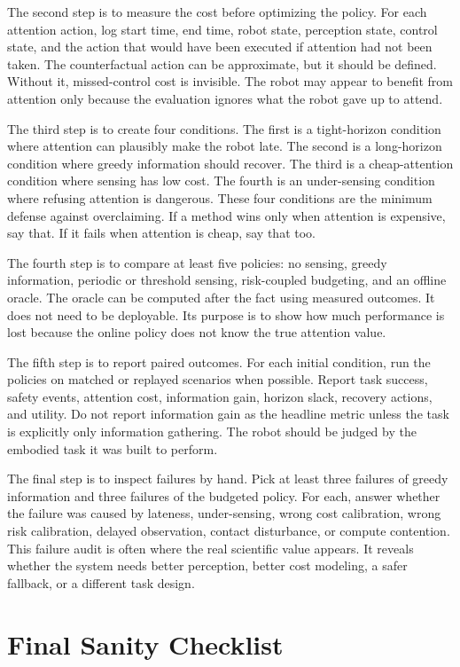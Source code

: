 \documentclass{article}
\begin{document}
The second step is to measure the cost before optimizing the policy. For each
attention action, log start time, end time, robot state, perception state,
control state, and the action that would have been executed if attention had
not been taken. The counterfactual action can be approximate, but it should be
defined. Without it, missed-control cost is invisible. The robot may appear to
benefit from attention only because the evaluation ignores what the robot gave
up to attend.

The third step is to create four conditions. The first is a tight-horizon
condition where attention can plausibly make the robot late. The second is a
long-horizon condition where greedy information should recover. The third is a
cheap-attention condition where sensing has low cost. The fourth is an
under-sensing condition where refusing attention is dangerous. These four
conditions are the minimum defense against overclaiming. If a method wins only
when attention is expensive, say that. If it fails when attention is cheap, say
that too.

The fourth step is to compare at least five policies: no sensing, greedy
information, periodic or threshold sensing, risk-coupled budgeting, and an
offline oracle. The oracle can be computed after the fact using measured
outcomes. It does not need to be deployable. Its purpose is to show how much
performance is lost because the online policy does not know the true attention
value.

The fifth step is to report paired outcomes. For each initial condition, run
the policies on matched or replayed scenarios when possible. Report task
success, safety events, attention cost, information gain, horizon slack,
recovery actions, and utility. Do not report information gain as the headline
metric unless the task is explicitly only information gathering. The robot
should be judged by the embodied task it was built to perform.

The final step is to inspect failures by hand. Pick at least three failures of
greedy information and three failures of the budgeted policy. For each, answer
whether the failure was caused by lateness, under-sensing, wrong cost
calibration, wrong risk calibration, delayed observation, contact disturbance,
or compute contention. This failure audit is often where the real scientific
value appears. It reveals whether the system needs better perception, better
cost modeling, a safer fallback, or a different task design.

\section{Final Sanity Checklist}
\end{document}
